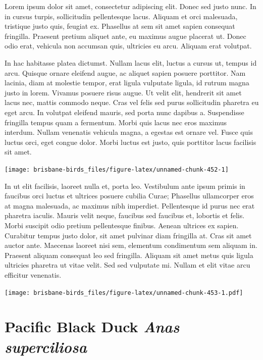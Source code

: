 \documentclass[]{book}
\let\origfigure\figure
\let\endorigfigure\endfigure
\renewenvironment{figure}[1][2] {
  \expandafter\origfigure\expandafter[H]
} {
  \endorigfigure
}
\begin{document}
Lorem ipsum dolor sit amet, consectetur adipiscing elit. Donec sed justo
nunc. In in cursus turpis, sollicitudin pellentesque lacus. Aliquam et
orci malesuada, tristique justo quis, feugiat ex. Phasellus at sem sit
amet sapien consequat fringilla. Praesent pretium aliquet ante, eu
maximus augue placerat ut. Donec odio erat, vehicula non accumsan quis,
ultricies eu arcu. Aliquam erat volutpat.

In hac habitasse platea dictumst. Nullam lacus elit, luctus a cursus ut,
tempus id arcu. Quisque ornare eleifend augue, ac aliquet sapien posuere
porttitor. Nam lacinia, diam at molestie tempor, erat ligula vulputate
ligula, id rutrum magna justo in lorem. Vivamus posuere risus augue. Ut
velit elit, hendrerit sit amet lacus nec, mattis commodo neque. Cras vel
felis sed purus sollicitudin pharetra eu eget arcu. In volutpat eleifend
mauris, sed porta nunc dapibus a. Suspendisse fringilla tempus quam a
fermentum. Morbi quis lacus nec eros maximus interdum. Nullam venenatis
vehicula magna, a egestas est ornare vel. Fusce quis luctus orci, eget
congue dolor. Morbi luctus est justo, quis porttitor lacus facilisis sit
amet.

\begin{figure}
\texttt{[image: brisbane-birds\_files/figure-latex/unnamed-chunk-452-1]} \caption{insert figure caption}\label{fig:unnamed-chunk-452}
\end{figure}

In ut elit facilisis, laoreet nulla et, porta leo. Vestibulum ante ipsum
primis in faucibus orci luctus et ultrices posuere cubilia Curae;
Phasellus ullamcorper eros at magna malesuada, ac maximus nibh
imperdiet. Pellentesque id purus nec erat pharetra iaculis. Mauris velit
neque, faucibus sed faucibus et, lobortis et felis. Morbi suscipit odio
pretium pellentesque finibus. Aenean ultrices ex sapien. Curabitur
tempus justo dolor, sit amet pulvinar diam fringilla at. Cras sit amet
auctor ante. Maecenas laoreet nisi sem, elementum condimentum sem
aliquam in. Praesent aliquam consequat leo sed fringilla. Aliquam sit
amet metus quis ligula ultricies pharetra ut vitae velit. Sed sed
vulputate mi. Nullam et elit vitae arcu efficitur venenatis.

\begin{figure}
\centering
\texttt{[image: brisbane-birds\_files/figure-latex/unnamed-chunk-453-1.pdf]}
\caption{\label{fig:unnamed-chunk-453}insert figure caption}
\end{figure}

\section{\texorpdfstring{Pacific Black Duck \emph{Anas
superciliosa}}{Pacific Black Duck Anas superciliosa}}\label{pacific-black-duck-anas-superciliosa}
\end{document}
